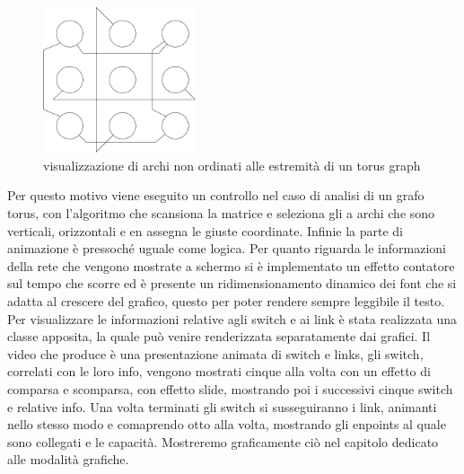 \documentclass[binding=0.6cm]{sapthesis}
\begin{document}
\begin{figure}[h]
    \centering
    \includegraphics[width=0.4\textwidth]{immagini/archi_asimmetrici_torus.png}
    \caption{visualizzazione di archi non ordinati alle estremità di un torus graph}
    \label{fig:torus_archi_asimmetrici}
\end{figure}

Per questo motivo viene eseguito un controllo nel caso di analisi di un grafo torus, con l'algoritmo che scansiona la matrice e seleziona gli a archi che sono verticali, orizzontali
e en assegna le giuste coordinate.
Infinie la parte di animazione è pressoché uguale come logica.
Per quanto riguarda le informazioni della rete che vengono mostrate a schermo si è implementato un effetto contatore sul tempo che scorre ed è presente
un ridimensionamento dinamico dei font che si adatta al crescere del grafico, questo per poter rendere sempre leggibile il testo.
Per visualizzare le informazioni relative agli switch e ai link è stata realizzata una classe apposita, la quale può venire renderizzata separatamente dai grafici.
Il video che produce è una presentazione animata di switch e links, gli switch, correlati con le loro info, vengono mostrati cinque alla volta con un effetto di comparsa e scomparsa, con effetto slide, mostrando poi i successivi cinque switch e relative info.
Una volta terminati gli switch si susseguiranno i link, animanti nello stesso modo e comaprendo otto alla volta, mostrando gli enpoints al quale sono collegati e le capacità. Mostreremo graficamente ciò nel capitolo dedicato alle modalità grafiche.
\end{document}
